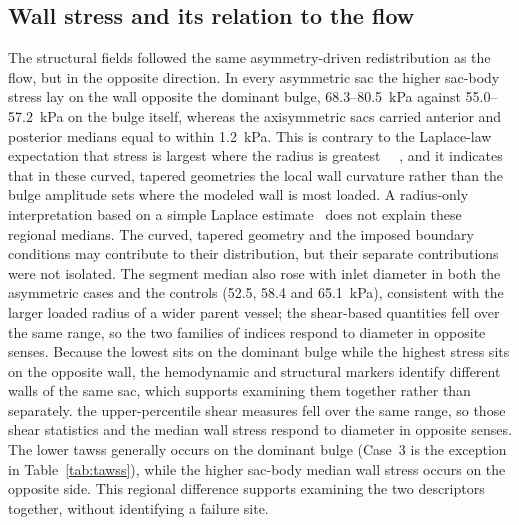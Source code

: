 \documentclass[12pt,a4paper]{article}
\newcommand{\cfdrevision}[1]{#1} %
\newcommand{\TAWSS}{\ac{tawss}\xspace}
\theoremstyle{definition}
\numberwithin{equation}{section}
\providecommand{\DIFaddtex}[1]{{\protect\color{blue} \sf #1}} %
\providecommand{\DIFdeltex}[1]{{\protect\color{red} \scriptsize #1}} %
\providecommand{\DIFaddbegin}{} %
\providecommand{\DIFaddend}{} %
\providecommand{\DIFdelbegin}{} %
\providecommand{\DIFdelend}{} %
\providecommand{\DIFadd}[1]{\texorpdfstring{\DIFaddtex{#1}}{#1}} %
\providecommand{\DIFdel}[1]{\texorpdfstring{\DIFdeltex{#1}}{}} %
\newcommand{\DIFscaledelfig}{0.5}
\newlength{\DIFdelgraphicswidth} %
\newlength{\DIFdelgraphicsheight} %
\newcommand{\DIFaddincludegraphics}[2][]{{\color{blue}\fbox{\DIFOincludegraphics[#1]{#2}}}} %
\newcommand{\DIFdelincludegraphics}[2][]{%
\sbox{\DIFdelgraphicsbox}{\DIFOincludegraphics[#1]{#2}}%
\settoboxwidth{\DIFdelgraphicswidth}{\DIFdelgraphicsbox} %
\settoboxtotalheight{\DIFdelgraphicsheight}{\DIFdelgraphicsbox} %
\scalebox{\DIFscaledelfig}{%
\parbox[b]{\DIFdelgraphicswidth}{\usebox{\DIFdelgraphicsbox}\\[-\baselineskip] \rule{\DIFdelgraphicswidth}{0em}}\llap{\resizebox{\DIFdelgraphicswidth}{\DIFdelgraphicsheight}{%
\setlength{\unitlength}{\DIFdelgraphicswidth}%
\begin{picture}(1,1)%
\thicklines\linethickness{2pt} %
{\color[rgb]{1,0,0}\put(0,0){\framebox(1,1){}}}%
{\color[rgb]{1,0,0}\put(0,0){\line( 1,1){1}}}%
{\color[rgb]{1,0,0}\put(0,1){\line(1,-1){1}}}%
\end{picture}%
}\hspace*{3pt}}} %
} %
\DeclareRobustCommand{\DIFaddbegin}{\DIFOaddbegin \let\includegraphics\DIFaddincludegraphics} %
\DeclareRobustCommand{\DIFaddend}{\DIFOaddend \let\includegraphics\DIFOincludegraphics} %
\DeclareRobustCommand{\DIFdelbegin}{\DIFOdelbegin \let\includegraphics\DIFdelincludegraphics} %
\DeclareRobustCommand{\DIFdelend}{\DIFOaddend \let\includegraphics\DIFOincludegraphics} %
\begin{document}
\subsection{Wall stress and its relation to the flow}
The structural fields followed the same asymmetry-driven redistribution as the flow, but in the opposite direction. In every asymmetric sac the higher sac-body stress lay on the wall opposite the dominant bulge, 68.3--80.5~kPa against 55.0--57.2~kPa on the bulge itself, whereas the axisymmetric sacs carried anterior and posterior medians equal to within 1.2~kPa. \DIFdelbegin \DIFdel{This is contrary to the Laplace-law expectation that stress is largest where the radius is greatest~\mbox{%
\cite{dobrin1989pathophysiology}}\hskip0pt%
, and it indicates that in these curved, tapered geometries the local wall curvature rather than the bulge amplitude sets where the modeled wall is most loaded. }\DIFdelend \DIFaddbegin \DIFadd{\cfdrevision{A radius-only interpretation based on a simple Laplace estimate~\cite{dobrin1989pathophysiology} does not explain these regional medians. The curved, tapered geometry and the imposed boundary conditions may contribute to their distribution, but their separate contributions were not isolated.} }\DIFaddend The segment median also rose with inlet diameter in both the asymmetric cases and the controls (52.5, 58.4 and 65.1~kPa), consistent with the larger loaded radius of a wider parent vessel; \DIFdelbegin \DIFdel{the shear-based quantities fell over the same range, so the two families of indices respond to diameter in opposite senses. Because the lowest }%
\DIFdel{sits on the dominant bulge while the highest stress sits on the opposite wall, the hemodynamic and structural markers identify different walls of the same sac, which supports examining them together rather than separately. 
}\DIFdelend \DIFaddbegin \DIFadd{\cfdrevision{the upper-percentile shear measures fell over the same range, so those shear statistics and the median wall stress respond to diameter in opposite senses.} \cfdrevision{The lower \TAWSS generally occurs on the dominant bulge (Case~3 is the exception in Table~\ref{tab:tawss}), while the higher sac-body median wall stress occurs on the opposite side. This regional difference supports examining the two descriptors together, without identifying a failure site.} 
}\DIFaddend 
\end{document}

